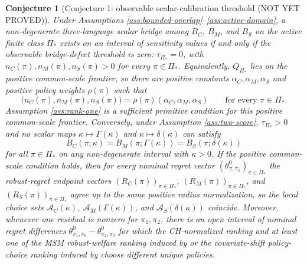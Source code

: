 \documentclass[11pt]{article}
\theoremstyle{definition}
\theoremstyle{plain}
\newtheorem{conjecture}{Conjecture}
\theoremstyle{remark}
\begin{document}
\begin{conjecture}[Conjecture 1: observable scalar-calibration threshold (NOT YET PROVED)]\label{conj:calibration-frontier}
Under Assumptions \ref{ass:bounded-overlap}--\ref{ass:active-domain}, a non-degenerate three-language scalar bridge among $B_C$, $B_M$, and $B_S$ on the active finite class $\Pi_\ast$ exists on an interval of sensitivity values if and only if the observable bridge-defect threshold is zero: $\tau_{\Pi_\ast}=0$, with $n_C(\pi),n_M(\pi),n_S(\pi)>0$ for every $\pi\in\Pi_\ast$.  Equivalently, $Q_{\Pi_\ast}$ lies on the positive common-scale frontier, so there are positive constants $\alpha_C,\alpha_M,\alpha_S$ and positive policy weights $\rho(\pi)$ such that
\[
  \bigl(n_C(\pi),n_M(\pi),n_S(\pi)\bigr)
  = \rho(\pi)(\alpha_C,\alpha_M,\alpha_S)
  \qquad\text{for every }\pi\in\Pi_\ast.
\]
Assumption \ref{ass:rank-one} is a sufficient primitive condition for this positive common-scale frontier.  Conversely, under Assumption \ref{ass:two-score}, $\tau_{\Pi_\ast}>0$ and no scalar maps $\kappa\mapsto\Gamma(\kappa)$ and $\kappa\mapsto\delta(\kappa)$ can satisfy
\[
  B_C(\pi;\kappa)=B_M(\pi;\Gamma(\kappa))=B_S(\pi;\delta(\kappa))
\]
for all $\pi\in\Pi_\ast$ on any non-degenerate interval with $\kappa>0$.  If the positive common-scale condition holds, then for every nominal regret vector $(\theta^0_{\pi,\pi_0})_{\pi\in\Pi_\ast}$ the robust-regret endpoint vectors $(R_C(\pi))_{\pi\in\Pi_\ast}$, $(R_M(\pi))_{\pi\in\Pi_\ast}$, and $(R_S(\pi))_{\pi\in\Pi_\ast}$ agree up to the same positive radius normalization, so the local choice sets $\mathcal A_C(\kappa)$, $\mathcal A_M(\Gamma(\kappa))$, and $\mathcal A_S(\delta(\kappa))$ coincide.  Moreover, whenever one residual is nonzero for $\pi_1,\pi_2$, there is an open interval of nominal regret differences $\theta^0_{\pi_1,\pi_0}-\theta^0_{\pi_2,\pi_0}$ for which the CH-normalized ranking and at least one of the MSM robust-welfare ranking induced by \citet{JinXuZhengZhou2025} or the covariate-shift policy-choice ranking induced by \citet{AdjahoChristensen2025} choose different unique policies.
\end{conjecture}
\end{document}

